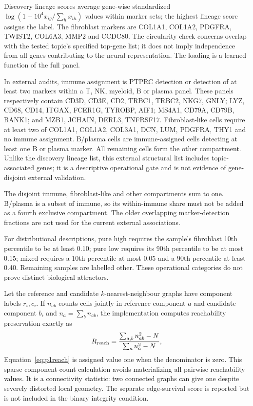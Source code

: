 \documentclass[10pt,a4paper]{article}
\begin{document}
Discovery lineage scores average gene-wise standardized $\log(1+10^4x_{ig}/\sum_hx_{ih})$ values within marker sets; the highest lineage score assigns the label. The fibroblast markers are COL1A1, COL1A2, PDGFRA, TWIST2, COL6A3, MMP2 and CCDC80. The circularity check concerns overlap with the tested topic's specified top-gene list; it does not imply independence from all genes contributing to the neural representation. The loading is a learned function of the full panel.

In external audits, immune assignment is PTPRC detection or detection of at least two markers within a T, NK, myeloid, B or plasma panel. These panels respectively contain CD3D, CD3E, CD2, TRBC1, TRBC2, NKG7, GNLY; LYZ, CD68, CD14, ITGAX, FCER1G, TYROBP, AIF1; MS4A1, CD79A, CD79B, BANK1; and MZB1, JCHAIN, DERL3, TNFRSF17. Fibroblast-like cells require at least two of COL1A1, COL1A2, COL3A1, DCN, LUM, PDGFRA, THY1 and no immune assignment. B/plasma cells are immune-assigned cells detecting at least one B or plasma marker. All remaining cells form the other compartment. Unlike the discovery lineage list, this external structural list includes topic-associated genes; it is a descriptive operational gate and is not evidence of gene-disjoint external validation.

The disjoint immune, fibroblast-like and other compartments sum to one. B/plasma is a subset of immune, so its within-immune share must not be added as a fourth exclusive compartment. The older overlapping marker-detection fractions are not used for the current external associations.

For distributional descriptions, pure high requires the sample's fibroblast 10th percentile to be at least 0.10; pure low requires its 90th percentile to be at most 0.15; mixed requires a 10th percentile at most 0.05 and a 90th percentile at least 0.40. Remaining samples are labelled other. These operational categories do not prove distinct biological attractors.

Let the reference and candidate $k$-nearest-neighbour graphs have component labels $r_i,c_i$. If $n_{ab}$ counts cells jointly in reference component $a$ and candidate component $b$, and $n_a=\sum_bn_{ab}$, the implementation computes reachability preservation exactly as
\begin{equation}
R_{\rm reach}=\frac{\sum_{a,b}n_{ab}^2-N}{\sum_an_a^2-N},\label{eq:p1reach}
\end{equation}
Equation~\eqref{eq:p1reach} is assigned value one when the denominator is zero. This sparse component-count calculation avoids materializing all pairwise reachability values. It is a connectivity statistic: two connected graphs can give one despite severely distorted local geometry. The separate edge-survival score is reported but is not included in the binary integrity condition.
\end{document}
